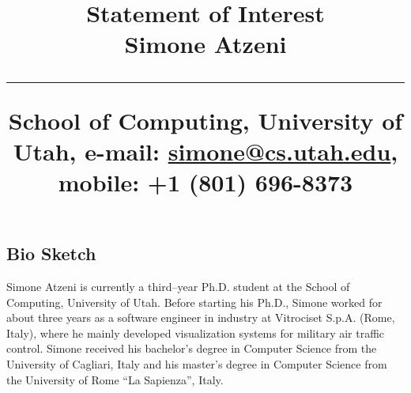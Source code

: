 \documentclass[svgnames,10pt]{article}
\title{%
        \vspace{-2\baselineskip}
            \normalsize
            Statement of Interest\\
            \vspace{5pt}
            {\large\textbf{Simone Atzeni}}\\
            \vspace{1.0\baselineskip}
            \hrule
            \vspace{0.5\baselineskip}
            School of Computing, University of Utah,
            e-mail: \href{mailto:simone@cs.utah.edu}{simone@cs.utah.edu},
            mobile: +1 (801) 696-8373
        \vspace{-1.5ex}
        }
\date{}
\author{}
\newenvironment{list2}{
  \begin{list}{$\bullet$}{%
      \setlength{\itemsep}{0in}
      \setlength{\parsep}{0in} \setlength{\parskip}{0in}
      \setlength{\topsep}{0in} \setlength{\partopsep}{0in} 
      \setlength{\leftmargin}{0.25in}}}{\end{list}}
\newcommand{\parag}{\vspace{-2.5mm}}
\begin{document}
\maketitle
\vspace{-4\baselineskip}

\vspace{-10pt}
\subsection{Bio Sketch}
\vspace{-5pt}
Simone Atzeni is currently a third--year Ph.D. student at the School of
Computing, University of Utah.
%
Before starting his Ph.D., Simone worked for about three years as a software
engineer in industry at Vitrociset S.p.A. (Rome, Italy), where he mainly
developed visualization systems for military air traffic control.
%
Simone received his bachelor's degree in Computer Science from the University
of Cagliari, Italy and his master's degree in Computer Science from the
University of Rome ``La Sapienza'', Italy.



\end{document}
